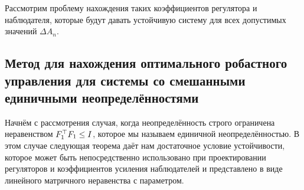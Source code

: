 Рассмотрим проблему нахождения таких коэффициентов регулятора и наблюдателя, которые будут давать устойчивую систему для всех допустимых значений $\Delta {A}_n$.

\subsection{Метод для нахождения оптимального робастного управления для системы со смешанными единичными неопределённостями}\label{sec:ch4/sect2/sub1}

Начнём с рассмотрения случая, когда неопределённость строго ограничена неравенством ${F}_1^\top{F}_1\leq {I}$, которое мы называем единичной неопределённостью. В этом случае следующая теорема даёт нам достаточное условие устойчивости, которое может быть непосредственно использовано при проектировании регуляторов и коэффициентов усиления наблюдателей и представлено в виде линейного матричного неравенства с параметром.

